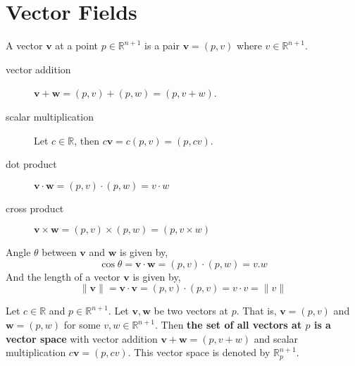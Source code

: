 \section{Vector Fields}
\begin{definition}
	A vector $\boldsymbol{v}$ at a point $p \in \mathbb{R}^{n+1}$ is a pair $\boldsymbol{v} = (p,v)$ where $v \in \mathbb{R}^{n+1}$.
\end{definition}
\begin{description}
	\item[vector addition] $\boldsymbol{v} + \boldsymbol{w} = (p,v) + (p,w) = (p,v+w)$.
	\item[scalar multiplication] Let $c \in \mathbb{R}$, then $c \boldsymbol{v} =  c(p,v) = (p,cv)$.
	\item[dot product] $\boldsymbol{v}\cdot \boldsymbol{w} = (p,v)\cdot(p,w) = v \cdot w$
	\item[cross product] $\boldsymbol{v}\times \boldsymbol{w} = (p,v)\times(p,w) = (p,v \times w)$
\end{description}
\begin{remark}
	Angle $\theta$ between $\boldsymbol{v}$ and $\boldsymbol{w}$ is given by,
	\begin{equation}
		\cos \theta = \boldsymbol{v}\cdot\boldsymbol{w} = (p,v)\cdot(p,w) = v.w
	\end{equation}
	And the length of a vector $\boldsymbol{v}$ is given by,
	\begin{equation}
		\|\boldsymbol{v}\| = \boldsymbol{v}\cdot\boldsymbol{v} = (p,v)\cdot(p,v) = v\cdot v = \| v \|
	\end{equation}
\end{remark}

\begin{remark}
	Let $c \in \mathbb{R}$ and $p \in \mathbb{R}^{n+1}$.
	Let $\boldsymbol{v}, \boldsymbol{w}$ be two vectors at $p$.
	That is, $\boldsymbol{v} = (p,v)$ and $\boldsymbol{w} = (p,w)$ for some $v,w \in \mathbb{R}^{n+1}$.
	Then \textbf{the set of all vectors at $p$ is a vector space} with vector addition $\boldsymbol{v}+\boldsymbol{w} = (p,v+w)$ and scalar multiplication $c\boldsymbol{v} = (p,cv)$.
	This vector space is denoted by $\mathbb{R}_p^{n+1}$.
\end{remark}

